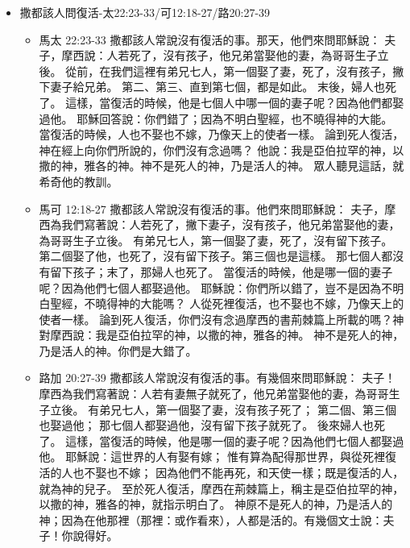 \begin{itemize}
\item{撒都該人問復活-太22:23-33/可12:18-27/路20:27-39}
\begin{itemize}
\item{馬太 22:23-33}
撒都該人常說沒有復活的事。那天，他們來問耶穌說：
夫子，摩西說：人若死了，沒有孩子，他兄弟當娶他的妻，為哥哥生子立後。
從前，在我們這裡有弟兄七人，第一個娶了妻，死了，沒有孩子，撇下妻子給兄弟。
第二、第三、直到第七個，都是如此。
末後，婦人也死了。
這樣，當復活的時候，他是七個人中哪一個的妻子呢？因為他們都娶過他。
耶穌回答說：你們錯了；因為不明白聖經，也不曉得神的大能。
當復活的時候，人也不娶也不嫁，乃像天上的使者一樣。
論到死人復活，神在經上向你們所說的，你們沒有念過嗎？
他說：我是亞伯拉罕的神，以撒的神，雅各的神。神不是死人的神，乃是活人的神。
眾人聽見這話，就希奇他的教訓。
\item{馬可 12:18-27}
撒都該人常說沒有復活的事。他們來問耶穌說：
夫子，摩西為我們寫著說：人若死了，撇下妻子，沒有孩子，他兄弟當娶他的妻，為哥哥生子立後。
有弟兄七人，第一個娶了妻，死了，沒有留下孩子。
第二個娶了他，也死了，沒有留下孩子。第三個也是這樣。
那七個人都沒有留下孩子；末了，那婦人也死了。
當復活的時候，他是哪一個的妻子呢？因為他們七個人都娶過他。
耶穌說：你們所以錯了，豈不是因為不明白聖經，不曉得神的大能嗎？
人從死裡復活，也不娶也不嫁，乃像天上的使者一樣。
論到死人復活，你們沒有念過摩西的書荊棘篇上所載的嗎？神對摩西說：我是亞伯拉罕的神，以撒的神，雅各的神。
神不是死人的神，乃是活人的神。你們是大錯了。
\item{路加 20:27-39}
撒都該人常說沒有復活的事。有幾個來問耶穌說：
夫子！摩西為我們寫著說：人若有妻無子就死了，他兄弟當娶他的妻，為哥哥生子立後。
有弟兄七人，第一個娶了妻，沒有孩子死了；
第二個、第三個也娶過他；
那七個人都娶過他，沒有留下孩子就死了。
後來婦人也死了。
這樣，當復活的時候，他是哪一個的妻子呢？因為他們七個人都娶過他。
耶穌說：這世界的人有娶有嫁；
惟有算為配得那世界，與從死裡復活的人也不娶也不嫁；
因為他們不能再死，和天使一樣；既是復活的人，就為神的兒子。
至於死人復活，摩西在荊棘篇上，稱主是亞伯拉罕的神，以撒的神，雅各的神，就指示明白了。
神原不是死人的神，乃是活人的神；因為在他那裡（那裡：或作看來），人都是活的。有幾個文士說：夫子！你說得好。


\end{itemize}
\end{itemize}

